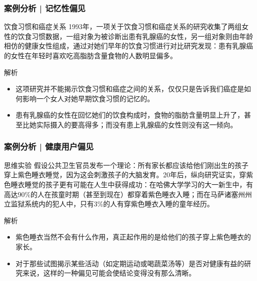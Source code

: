 \begin{frame}
  \frametitle{案例分析 | 记忆性偏见}
  \begin{block}{饮食习惯和癌症关系}
    1993年，一项关于饮食习惯和癌症关系的研究收集了两组女性的饮食习惯数据，一组对象为被诊断出患有乳腺癌的女性，另一组对象则由年龄相仿的健康女性组成，通过对她们早年的饮食习惯进行对比研究发现：患有乳腺癌的女性在年轻时喜欢吃高脂肪含量食物的人数明显偏多。
  \end{block}
  \pause \pause \pause \pause
  \begin{block}{解析}
    \begin{itemize}
      \item 这项研究并不能揭示饮食习惯和癌症之间的关系，仅仅只是告诉我们癌症是如何影响一个女人对她早期饮食习惯的记忆的。
      \item 患有乳腺癌的女性在回忆她们的饮食构成时，食物的脂肪含量明显上升了，甚至比她实际摄入的要高得多；而没有患上乳腺癌的女性则没有这一倾向。
    \end{itemize}
  \end{block}
\end{frame}

\begin{frame}
  \frametitle{案例分析 | 健康用户偏见}
   \begin{block}{思维实验}
     假设公共卫生官员发布一个理论：所有家长都应该给他们刚出生的孩子穿上紫色睡衣睡觉，因为这会刺激孩子的大脑发育。20年后，纵向研究证实，穿紫色睡衣睡觉的孩子更有可能在人生中获得成功：在哈佛大学学习的大一新生中，有高达90\%的人在孩童时期（甚至到现在）都穿着紫色睡衣入睡；而在马萨诸塞州州立监狱系统内的犯人中，只有3\%的人有穿紫色睡衣入睡的童年经历。
   \end{block} 
  \pause \pause \pause \pause
   \begin{block}{解析}
     \begin{itemize}
       \item 紫色睡衣当然不会有什么作用，真正起作用的是给他们的孩子穿上紫色睡衣的家长。
       \item 对于那些试图揭示某些活动（如定期运动或喝蔬菜汤等）是否对健康有益的研究来说，这样的一种偏见可能会使结论变得没有那么清晰。
     \end{itemize}
   \end{block}
\end{frame}

